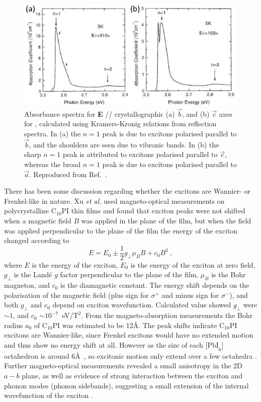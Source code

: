 \begin{figure} [ht]
\centering
\includegraphics[width=\textwidth]{Fig14}
\caption{Absorbance spectra for {\bf E} // crystallographic (a) $\vec{b}$, and (b) $\vec{c}$ axes for , calculated using Kramers-Kronig relations from reflection spectra. In (a) the $n=1$ peak is due to excitons polarised parallel to $\vec{b}$, and the shoulders are seen due to vibronic bands. In (b) the sharp $n=1$ peak is attributed to excitons polarised parallel to $\vec{c}$, whereas the broad $n=1$ peak is due to excitons polarised parallel to $\vec{a}$. Reproduced from Ref.\ \cite{Goto2001}.}
\label{2Fig14}
\end{figure}

There has been some discussion regarding whether the excitons are Wannier- or Frenkel-like in nature. Xu \textit{et al.} used magneto-optical measurements on polycrystalline $\textrm{C}_{10}$PI thin films and found that exciton peaks were not shifted when a magnetic field $B$ was applied in the plane of the film, but when the field was applied perpendicular to the plane of the film the energy of the exciton changed according to
\begin{equation}
E = E_0 \pm \frac{1}{2} g_{\bot} \mu_{B} B + c_0 B^2~,
\label{mag-shift}
\end{equation} 
where $E$ is the energy of the exciton, $E_0$ is the energy of the exciton at zero field, $g_{\bot}$ is the Land\'{e} $g$ factor perpendicular to the plane of the film, $\mu_B$ is the Bohr magneton, and $c_0$ is the diamagnetic constant. The energy shift depends on the polarisation of the magnetic field (plus sign for $\sigma^+$ and minus sign for $\sigma^-$), and both $g_{\bot}$ and $c_0$ depend on exciton wavefunction. Calculated value showed $g_{\bot}$ were $\sim1$, and $c_0$ $\sim 10^{-7}$~eV/$\textrm{T}^2$. From the magneto-absorption measurements the Bohr radius $a_0$ of $\textrm{C}_{10}$PI was estimated to be 12\AA. The peak shifts indicate $\textrm{C}_{10}$PI excitons are Wannier-like, since Frenkel excitons would have no extended motion and thus show no energy shift at all. However as the size of each $\textrm{[PbI}_6]$ octahedron is around 6\AA~\cite{Ishihara1990}, so excitonic motion only extend over a few octahedra \cite{Xu1991b}. Further magneto-optical measurements revealed a small anisotropy in the 2D $a-b$ plane, as well as evidence of strong interaction between the exciton and phonon modes (phonon sidebands), suggesting a small extension of the internal wavefunction of the exciton \cite{Hirasawa1993}.

